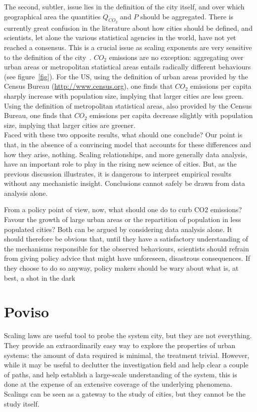 The second, subtler, issue lies in the definition of the city itself, and over which
geographical area the quantities $Q_{CO_2}$ and $P$ should be aggregated. There is currently great
confusion in the literature about how cities should be defined, and scientists, let alone the
various statistical agencies in the world, have not yet reached a consensus. This is a crucial
issue as scaling exponents are very sensitive to the definition of the city~\cite{Arcaute:2013}. $CO_2$ emissions are no exception: aggregating over urban areas or metropolitan
statistical areas entails radically different behaviours (see figure~\ref{fig}). For the US, using the
definition of urban areas provided by the Census Bureau (\url{http://www.census.org}), one finds
that $CO_2$ emissions per capita sharply increase with population size, implying that larger
cities are less green. Using the definition of metropolitan statistical areas, also provided by
the Census Bureau, one finds that $CO_2$ emissions per capita decrease slightly with population
size, implying that larger cities are greener.\\



Faced with these two opposite results, what should one conclude? Our point is that, in
the absence of a convincing model that accounts for these differences and how they arise,
nothing. Scaling relationships, and more generally data analysis, have an important role
to play in the rising new science of cities. But, as the previous discussion illustrates, it is
dangerous to interpret empirical results without any mechanistic insight. Conclusions cannot
safely be drawn from data analysis alone.

From a policy point of view, now, what should one do to curb CO2 emissions? Favour
the growth of large urban areas or the repartition of population in less populated cities?
Both can be argued by considering data analysis alone. It should therefore be obvious that,
until they have a satisfactory understanding of the mechanisms responsible for the observed
behaviours, scientists should refrain from giving policy advice that might have unforeseen,
disastrous consequences. If they choose to do so anyway, policy makers should be wary
about what is, at best, a shot in the dark

\section{Poviso}
\label{sec:poviso}

Scaling laws are useful tool to probe the system city, but they are not
everything. They provide an extraordinarily easy way to explore the properties
of urban systems: the amount of data required is minimal, the treatment
trivial. However, while it may be useful to declutter the investigation field
and help clear a couple of paths, and help establish a large-scale understanding
of the system, this is done at the expense of an extensive coverage of the
underlying phenomena. Scalings can be seen as a gateway to the study of cities,
but they cannot be the study itself.

